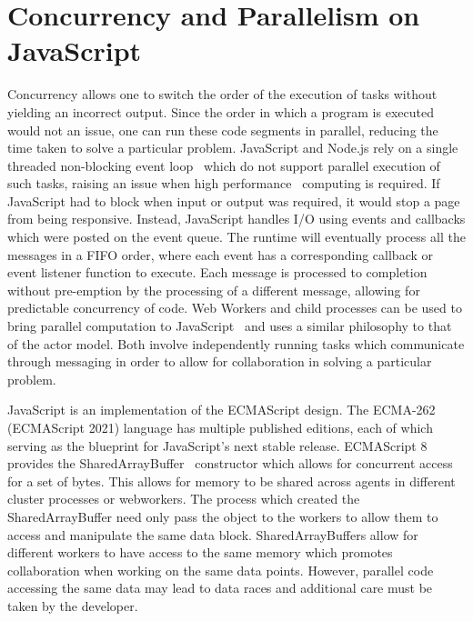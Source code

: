 \documentclass[12pt, a4paper]{report}
\theoremstyle{definition}
\theoremstyle{definition}%
\theoremstyle{definition}%
\theoremstyle{definition}%
\theoremstyle{definition}%
\theoremstyle{definition}%
\begin{document}
\section{Concurrency and Parallelism on JavaScript}
Concurrency allows one to switch the order of the execution of tasks without yielding an incorrect output. Since the order in which a program is executed would not an issue, one can run these code segments in parallel, reducing the time taken to solve a particular problem. JavaScript and Node.js rely on a single threaded non-blocking event loop~\cite{eventloopbrowser}\cite{eventloopnode} which do not support parallel execution of such tasks, raising an issue when high performance~\cite{highperformance} computing is required. If JavaScript had to block when input or output was required, it would stop a page from being responsive. Instead, JavaScript handles I/O using events and callbacks which were posted on the event queue. The runtime will eventually process all the messages in a FIFO order, where each event has a corresponding callback or event listener function to execute. Each message is processed to completion without pre-emption by the processing of a different message, allowing for predictable concurrency of code. Web Workers\cite{webworkers} and child processes\cite{cluster} can be used to bring parallel computation to JavaScript~\cite{concurrencyjs}\cite{spidersjs} and uses a similar philosophy to that of the actor model. Both involve independently running tasks which communicate through messaging in order to allow for collaboration in solving a particular problem.

JavaScript is an implementation of the ECMAScript design. The ECMA-262 (ECMAScript 2021) language has multiple published editions, each of which serving as the blueprint for JavaScript’s next stable release. ECMAScript 8 provides the SharedArrayBuffer~\cite{es8}\cite{sharedarraybuffer} constructor which allows for concurrent access for a set of bytes. This allows for memory to be shared across agents in different cluster processes or webworkers. The process which created the SharedArrayBuffer need only pass the object to the workers to allow them to access and manipulate the same data block. SharedArrayBuffers allow for different workers to have access to the same memory which promotes collaboration when working on the same data points. However, parallel code accessing the same data may lead to data races and additional care must be taken by the developer.
\end{document}
